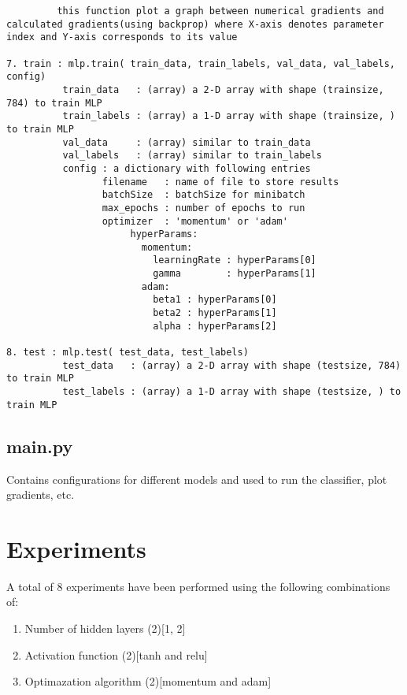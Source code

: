 \documentclass{article}
\begin{document}
\begin{verbatim}
         this function plot a graph between numerical gradients and calculated gradients(using backprop) where X-axis denotes parameter index and Y-axis corresponds to its value

7. train : mlp.train( train_data, train_labels, val_data, val_labels, config)
          train_data   : (array) a 2-D array with shape (trainsize, 784) to train MLP
          train_labels : (array) a 1-D array with shape (trainsize, ) to train MLP
          val_data     : (array) similar to train_data
          val_labels   : (array) similar to train_labels
          config : a dictionary with following entries
                 filename   : name of file to store results
                 batchSize  : batchSize for minibatch
                 max_epochs : number of epochs to run
                 optimizer  : 'momentum' or 'adam'
                      hyperParams:
                        momentum:
                          learningRate : hyperParams[0]
                          gamma        : hyperParams[1]
                        adam:
                          beta1 : hyperParams[0]
                          beta2 : hyperParams[1]
                          alpha : hyperParams[2]

8. test : mlp.test( test_data, test_labels)
          test_data   : (array) a 2-D array with shape (testsize, 784) to train MLP
          test_labels : (array) a 1-D array with shape (testsize, ) to train MLP
\end{verbatim}

\subsection{main.py}
Contains configurations for different models and used to run the classifier, plot gradients, etc.

\section{Experiments}

A total of 8 experiments have been performed using the following combinations of:
\begin{enumerate}
\item    Number of hidden layers \hspace{38pt}  (2)[1, 2]
\item    Activation function     \hspace{60pt} (2)[tanh and relu]
\item    Optimazation algorithm  \hspace{40pt} (2)[momentum and adam]

\end{enumerate}
\end{document}
